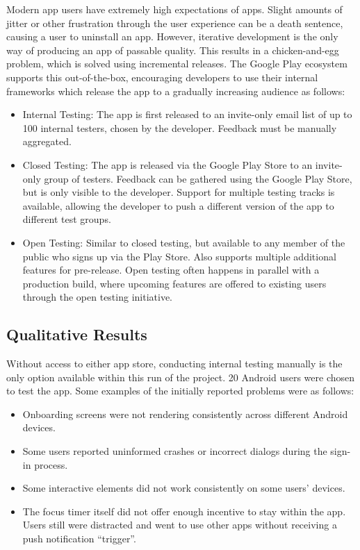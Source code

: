 Modern app users have extremely high expectations of apps. Slight amounts of jitter or other frustration through the user experience can be a death sentence, causing a user to uninstall an app. However, iterative development is the only way of producing an app of passable quality. This results in a chicken-and-egg problem, which is solved using incremental releases. The Google Play ecosystem supports this out-of-the-box, encouraging developers to use their internal frameworks which release the app to a gradually increasing audience as follows:

\begin{itemize}
	\item Internal Testing: The app is first released to an invite-only email list of up to 100 internal testers, chosen by the developer. Feedback must be manually aggregated.
	\item Closed Testing: The app is released via the Google Play Store to an invite-only group of testers. Feedback can be gathered using the Google Play Store, but is only visible to the developer. Support for multiple testing tracks is available, allowing the developer to push a different version of the app to different test groups.
	\item Open Testing: Similar to closed testing, but available to any member of the public who signs up via the Play Store. Also supports multiple additional features for pre-release. Open testing often happens in parallel with a production build, where upcoming features are offered to existing users through the open testing initiative.
\end{itemize}

\subsection{Qualitative Results}
Without access to either app store, conducting internal testing manually is the only option available within this run of the project. 20 Android users were chosen to test the app. Some examples of the initially reported problems were as follows:

\begin{itemize}
	\item Onboarding screens were not rendering consistently across different Android devices.
	\item Some users reported uninformed crashes or incorrect dialogs during the sign-in process.
	\item Some interactive elements did not work consistently on some users' devices.
	\item The focus timer itself did not offer enough incentive to stay within the app. Users still were distracted and went to use other apps without receiving a push notification ``trigger''.
\end{itemize}

